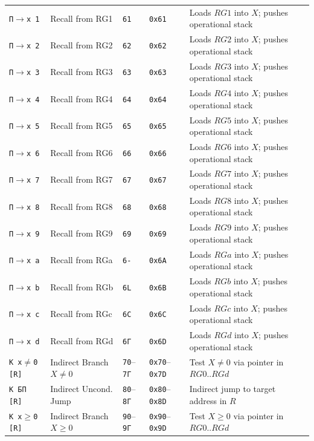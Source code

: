 \documentclass[11pt,a4paper]{article}
\begin{document}
{\begin{longtable}{p{2.2cm}p{3.0cm}>{\centering\arraybackslash}p{1.0cm}>{\centering\arraybackslash}p{1.2cm}p{7.3cm}}
\texttt{П$\to$x 1} & Recall from RG1 & \texttt{61} & \texttt{0x61} & Loads $RG1$ into $X$; pushes operational stack \\
\texttt{П$\to$x 2} & Recall from RG2 & \texttt{62} & \texttt{0x62} & Loads $RG2$ into $X$; pushes operational stack \\
\texttt{П$\to$x 3} & Recall from RG3 & \texttt{63} & \texttt{0x63} & Loads $RG3$ into $X$; pushes operational stack \\
\texttt{П$\to$x 4} & Recall from RG4 & \texttt{64} & \texttt{0x64} & Loads $RG4$ into $X$; pushes operational stack \\
\texttt{П$\to$x 5} & Recall from RG5 & \texttt{65} & \texttt{0x65} & Loads $RG5$ into $X$; pushes operational stack \\
\texttt{П$\to$x 6} & Recall from RG6 & \texttt{66} & \texttt{0x66} & Loads $RG6$ into $X$; pushes operational stack \\
\texttt{П$\to$x 7} & Recall from RG7 & \texttt{67} & \texttt{0x67} & Loads $RG7$ into $X$; pushes operational stack \\
\texttt{П$\to$x 8} & Recall from RG8 & \texttt{68} & \texttt{0x68} & Loads $RG8$ into $X$; pushes operational stack \\
\texttt{П$\to$x 9} & Recall from RG9 & \texttt{69} & \texttt{0x69} & Loads $RG9$ into $X$; pushes operational stack \\
\texttt{П$\to$x a} & Recall from RGa & \texttt{6-} & \texttt{0x6A} & Loads $RGa$ into $X$; pushes operational stack \\
\texttt{П$\to$x b} & Recall from RGb & \texttt{6L} & \texttt{0x6B} & Loads $RGb$ into $X$; pushes operational stack \\
\texttt{П$\to$x c} & Recall from RGc & \texttt{6C} & \texttt{0x6C} & Loads $RGc$ into $X$; pushes operational stack \\
\texttt{П$\to$x d} & Recall from RGd & \texttt{6Г} & \texttt{0x6D} & Loads $RGd$ into $X$; pushes operational stack \\
\midrule
\texttt{K x$\ne$0 [R]} & Indirect Branch $X \ne 0$ & \texttt{70}--\texttt{7Г} & \texttt{0x70}--\texttt{0x7D} & Test $X \ne 0$ via pointer in $RG0..RGd$ \\
\texttt{K БП [R]} & Indirect Uncond. Jump & \texttt{80}--\texttt{8Г} & \texttt{0x80}--\texttt{0x8D} & Indirect jump to target address in $R$ \\
\texttt{K x$\ge$0 [R]} & Indirect Branch $X \ge 0$ & \texttt{90}--\texttt{9Г} & \texttt{0x90}--\texttt{0x9D} & Test $X \ge 0$ via pointer in $RG0..RGd$ \\

\end{longtable}}
\end{document}
